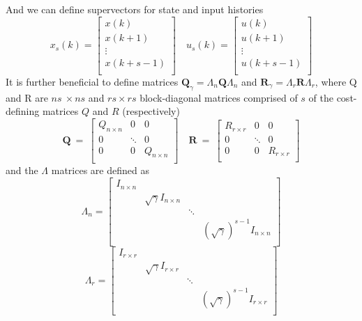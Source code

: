 And we can define supervectors for state and input histories
\begin{equation}
    x_s\left(k\right)=\left[\begin{matrix}x\left(k\right)\\x\left(k+1\right)\\\vdots\\x\left(k+s-1\right)\\\end{matrix}\right]	
    \quad
    u_s\left(k\right)=\left[\begin{matrix}u\left(k\right)\\u\left(k+1\right)\\\vdots\\u\left(k+s-1\right)\\\end{matrix}\right]
    \label{eq:supervector_state_input}
\end{equation}
It is further beneficial to define matrices $\textbf{Q}_\gamma=\Lambda_n\textbf{Q}\Lambda_n$ and $\textbf{R}_\gamma=\Lambda_r\textbf{R}\Lambda_r$, where Q and R are $ns\ \times ns$ and $rs\times rs$ block-diagonal matrices comprised of $s$ of the cost-defining matrices $Q$ and $R$ (respectively)
\begin{equation}
    \textbf{Q}\ =\ \left[\begin{matrix}Q_{n\times n}&0&0\\0&\ddots&0\\0&0&Q_{n\times n}\\\end{matrix}\right]
    \quad
    \textbf{R}\ =\ \left[\begin{matrix}R_{r\times r}&0&0\\0&\ddots&0\\0&0&R_{r\times r}\\\end{matrix}\right]
    \label{eq:QR_supervector}
\end{equation}
and the $\Lambda$ matrices are defined as
\begin{equation}
    \Lambda_n=\left[\begin{matrix}I_{n\times n}&&&\\&\sqrt\gamma I_{n\times n}&&\\&&\ddots&\\&&&{\left(\sqrt\gamma\right)}^{s-1}I_{n\times n}\\\end{matrix}\right]
    \label{eq:lambda_n}
\end{equation}
\begin{equation}
    \Lambda_r=\left[\begin{matrix}I_{r\times r}&&&\\&\sqrt\gamma I_{r\times r}&&\\&&\ddots&\\&&&{\left(\sqrt\gamma\right)}^{s-1}I_{r\times r}\\\end{matrix}\right]
    \label{eq:lambda_r}
\end{equation}

